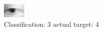 \begin{figure}[h!]
\begin{center}
\includegraphics[width=0.60\columnwidth]{figures/ID2575_class_3_target_4.png}
\end{center}
\caption{ Classification: 3 actual target: 4}
\label{fig:ID2575_class_3_target_4}
\end{figure}
